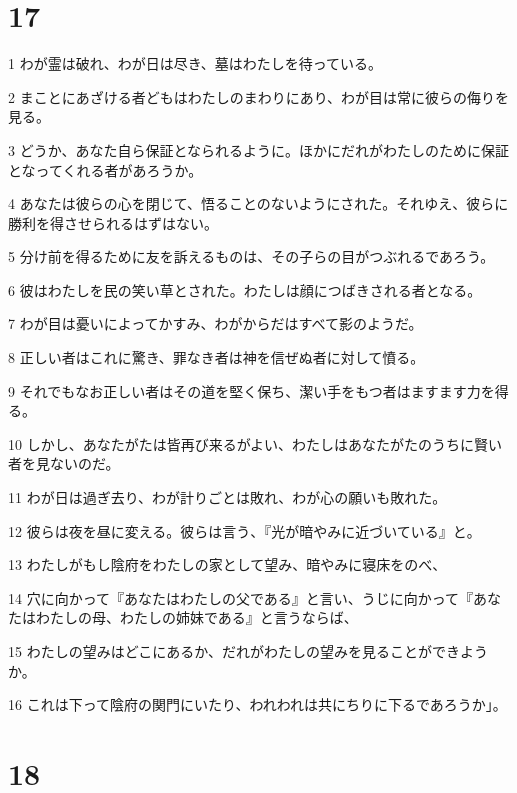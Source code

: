 \chapter{17}

\par 1 わが霊は破れ、わが日は尽き、墓はわたしを待っている。
\par 2 まことにあざける者どもはわたしのまわりにあり、わが目は常に彼らの侮りを見る。
\par 3 どうか、あなた自ら保証となられるように。ほかにだれがわたしのために保証となってくれる者があろうか。
\par 4 あなたは彼らの心を閉じて、悟ることのないようにされた。それゆえ、彼らに勝利を得させられるはずはない。
\par 5 分け前を得るために友を訴えるものは、その子らの目がつぶれるであろう。
\par 6 彼はわたしを民の笑い草とされた。わたしは顔につばきされる者となる。
\par 7 わが目は憂いによってかすみ、わがからだはすべて影のようだ。
\par 8 正しい者はこれに驚き、罪なき者は神を信ぜぬ者に対して憤る。
\par 9 それでもなお正しい者はその道を堅く保ち、潔い手をもつ者はますます力を得る。
\par 10 しかし、あなたがたは皆再び来るがよい、わたしはあなたがたのうちに賢い者を見ないのだ。
\par 11 わが日は過ぎ去り、わが計りごとは敗れ、わが心の願いも敗れた。
\par 12 彼らは夜を昼に変える。彼らは言う、『光が暗やみに近づいている』と。
\par 13 わたしがもし陰府をわたしの家として望み、暗やみに寝床をのべ、
\par 14 穴に向かって『あなたはわたしの父である』と言い、うじに向かって『あなたはわたしの母、わたしの姉妹である』と言うならば、
\par 15 わたしの望みはどこにあるか、だれがわたしの望みを見ることができようか。
\par 16 これは下って陰府の関門にいたり、われわれは共にちりに下るであろうか」。

\chapter{18}

